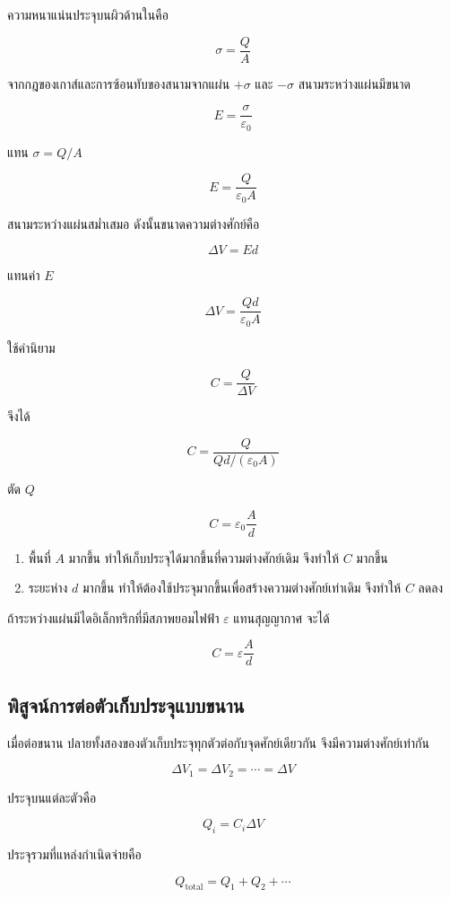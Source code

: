 ความหนาแน่นประจุบนผิวด้านในคือ

\[
\sigma=\frac{Q}{A}
\]

จากกฎของเกาส์และการซ้อนทับของสนามจากแผ่น $+\sigma$ และ $-\sigma$ สนามระหว่างแผ่นมีขนาด

\[
E=\frac{\sigma}{\varepsilon_0}
\]

แทน $\sigma=Q/A$

\[
E=\frac{Q}{\varepsilon_0A}
\]

สนามระหว่างแผ่นสม่ำเสมอ ดังนั้นขนาดความต่างศักย์คือ

\[
\Delta V=Ed
\]

แทนค่า $E$

\[
\Delta V=\frac{Qd}{\varepsilon_0A}
\]

ใช้คำนิยาม

\[
C=\frac{Q}{\Delta V}
\]

จึงได้

\[
C
=
\frac{Q}{Qd/(\varepsilon_0A)}
\]

ตัด $Q$

\[
\boxed{C=\varepsilon_0\frac{A}{d}}
\]

\begin{tcolorbox}[title=ความหมายของผลลัพธ์]
\begin{enumerate}
    \item พื้นที่ $A$ มากขึ้น ทำให้เก็บประจุได้มากขึ้นที่ความต่างศักย์เดิม จึงทำให้ $C$ มากขึ้น
    \item ระยะห่าง $d$ มากขึ้น ทำให้ต้องใช้ประจุมากขึ้นเพื่อสร้างความต่างศักย์เท่าเดิม จึงทำให้ $C$ ลดลง
\end{enumerate}
\end{tcolorbox}

ถ้าระหว่างแผ่นมีไดอิเล็กทริกที่มีสภาพยอมไฟฟ้า $\varepsilon$ แทนสุญญากาศ จะได้

\[
\boxed{C=\varepsilon\frac{A}{d}}
\]

\subsection{พิสูจน์การต่อตัวเก็บประจุแบบขนาน}

เมื่อต่อขนาน ปลายทั้งสองของตัวเก็บประจุทุกตัวต่อกับจุดศักย์เดียวกัน จึงมีความต่างศักย์เท่ากัน

\[
\Delta V_1=\Delta V_2=\cdots=\Delta V
\]

ประจุบนแต่ละตัวคือ

\[
Q_i=C_i\Delta V
\]

ประจุรวมที่แหล่งกำเนิดจ่ายคือ

\[
Q_{\text{total}}=Q_1+Q_2+\cdots
\]


